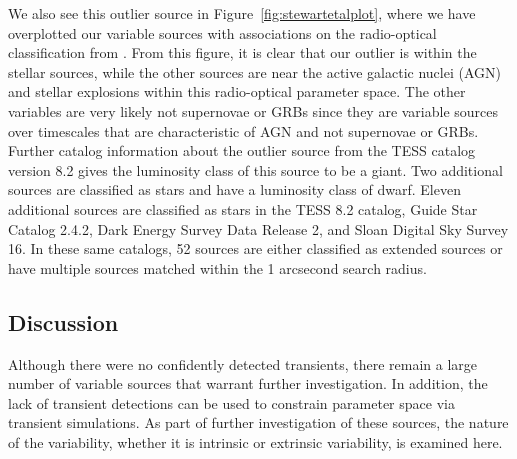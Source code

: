 \documentclass[12pt]{article}
\begin{document}
We also see this outlier source in Figure~\ref{fig:stewartetalplot}, where we have overplotted our variable sources with associations on the radio-optical classification from \citet{2018MNRAS.479.2481S}. From this figure, it is clear that our outlier is within the stellar sources, while the other sources are near the active galactic nuclei (AGN) and stellar explosions within this radio-optical parameter space. The other variables are very likely not supernovae or GRBs since they are variable sources over timescales that are characteristic of AGN and not supernovae or GRBs. Further catalog information about the outlier source from the TESS catalog version 8.2 gives the luminosity class of this source to be a giant. Two additional sources are classified as stars and have a luminosity class of dwarf. Eleven additional sources are classified as stars in the TESS 8.2 catalog, Guide Star Catalog 2.4.2, Dark Energy Survey Data Release 2, and Sloan Digital Sky Survey 16. In these same catalogs, 52 sources are either classified as extended sources or have multiple sources matched within the 1 arcsecond search radius. 


\subsection{Discussion}
\label{sec:discussion}
Although there were no confidently detected transients, there remain a large number of variable sources that warrant further investigation. In addition, the lack of transient detections can be used to constrain parameter space via transient simulations. As part of further investigation of these sources, the nature of the variability, whether it is intrinsic or extrinsic variability, is examined here.
\end{document}
